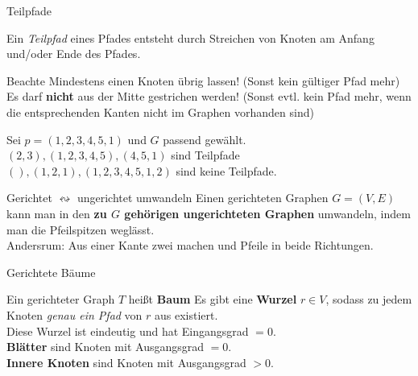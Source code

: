 \begin{frame}{Teilpfade}
	\begin{Definition}
		Ein \emph{Teilpfad} eines Pfades entsteht durch Streichen von Knoten am Anfang und/oder Ende des Pfades.
	\end{Definition}

	\pause
	\begin{block}{Beachte}
		Mindestens einen Knoten übrig lassen! (Sonst kein gültiger Pfad mehr)\\
		Es darf \textbf{nicht} aus der Mitte gestrichen werden! (Sonst evtl. kein Pfad mehr, wenn die entsprechenden Kanten nicht im Graphen vorhanden sind)
	\end{block}

	\pause
	\begin{Beispiel}
		Sei $p = (1, 2, 3, 4, 5, 1)$ und $G$ passend gewählt.\\
		\pause
		$(2, 3), (1, 2, 3, 4, 5), (4, 5, 1)$ sind Teilpfade\\
		$(), (1, 2, 1), (1, 2, 3, 4, 5, 1, 2)$ sind keine Teilpfade.
	\end{Beispiel}
\end{frame}


\begin{frame}{Gerichtet $\leftrightsquigarrow$ ungerichtet umwandeln}
	Einen gerichteten Graphen $G = (V,E)$ kann man in den \textbf{zu $G$ gehörigen ungerichteten Graphen} umwandeln, indem man die Pfeilspitzen weglässt. \\
	
	\medskip
	Andersrum: Aus einer Kante zwei machen und Pfeile in beide Richtungen.
	
\end{frame}

\begin{frame}{Gerichtete Bäume}
	\begin{Definition}
		Ein gerichteter Graph $T$ heißt \textbf{Baum} \Gdw Es gibt eine \textbf{Wurzel} $r \in V$, sodass zu jedem Knoten \emph{genau ein Pfad} von $r$ aus existiert. \\
		\smallskip
		Diese Wurzel ist eindeutig und hat Eingangsgrad $= 0$. \\
		\textbf{Blätter} sind Knoten mit Ausgangsgrad $= 0$. \\
		\textbf{Innere Knoten} sind Knoten mit Ausgangsgrad $> 0$. 
		
	\end{Definition}
\end{frame}

